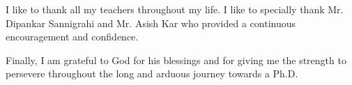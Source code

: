 I like to thank all my teachers throughout my life. I like to specially thank Mr. Dipankar Sannigrahi and Mr. Asish Kar who 
provided a continuous encouragement and confidence.

 
Finally, I am grateful to God for his blessings and for giving me the strength to persevere throughout the long and arduous journey towards a Ph.D.







